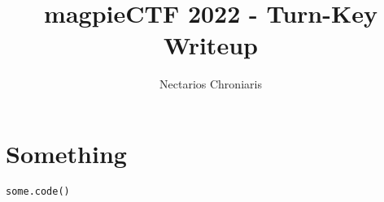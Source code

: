 \documentclass[11pt]{article}
\begin{document}
    \title{magpieCTF 2022 - Turn-Key Writeup}
    \author{Nectarios Chroniaris}

    \maketitle


    \section{Something}

    \begin{lstlisting}[gobble=8,label={lst:something}]
        some.code()
    \end{lstlisting}
\end{document}
